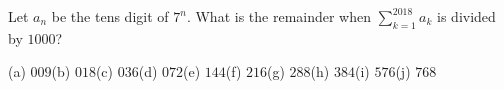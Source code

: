 Let $a_n$ be the tens digit of $7^n$. What is the remainder when $\displaystyle\sum_{k=1}^{2018}a_k$ is divided by $1000$?

(a) $009$\quad (b) $018$\quad (c) $036$\quad (d) $072$\quad (e) $144$\quad (f) $216$\quad (g) $288$\quad (h) $384$\quad (i) $576$\quad (j) $768$
